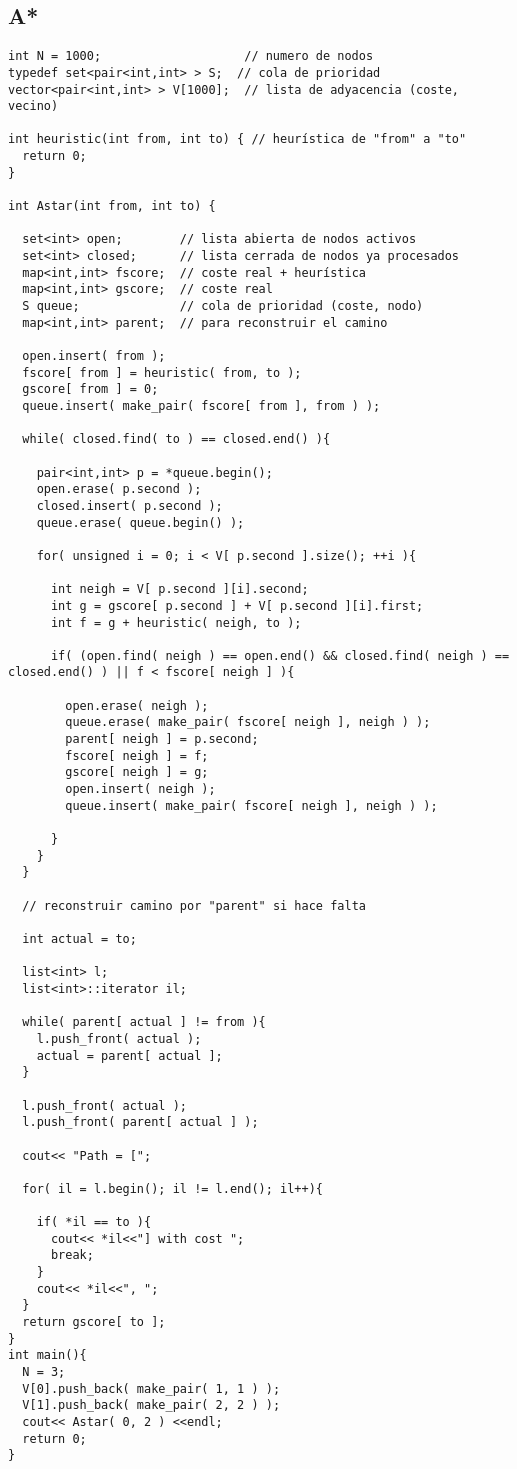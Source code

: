 \documentclass[10pt, a4, oneside]{article}
\begin{document}
\subsection{A*}
\begin{verbatim}
int N = 1000;                    // numero de nodos
typedef set<pair<int,int> > S;  // cola de prioridad
vector<pair<int,int> > V[1000];  // lista de adyacencia (coste, vecino)

int heuristic(int from, int to) { // heurística de "from" a "to"
  return 0;
}

int Astar(int from, int to) {

  set<int> open;        // lista abierta de nodos activos
  set<int> closed;      // lista cerrada de nodos ya procesados
  map<int,int> fscore;  // coste real + heurística
  map<int,int> gscore;  // coste real
  S queue;              // cola de prioridad (coste, nodo)
  map<int,int> parent;  // para reconstruir el camino
  
  open.insert( from );
  fscore[ from ] = heuristic( from, to );
  gscore[ from ] = 0;
  queue.insert( make_pair( fscore[ from ], from ) );
  
  while( closed.find( to ) == closed.end() ){
    
    pair<int,int> p = *queue.begin();
    open.erase( p.second );
    closed.insert( p.second );
    queue.erase( queue.begin() );
    
    for( unsigned i = 0; i < V[ p.second ].size(); ++i ){
      
      int neigh = V[ p.second ][i].second;
      int g = gscore[ p.second ] + V[ p.second ][i].first;
      int f = g + heuristic( neigh, to );
      
      if( (open.find( neigh ) == open.end() && closed.find( neigh ) == closed.end() ) || f < fscore[ neigh ] ){
        
        open.erase( neigh );
        queue.erase( make_pair( fscore[ neigh ], neigh ) );
        parent[ neigh ] = p.second;
        fscore[ neigh ] = f;
        gscore[ neigh ] = g;
        open.insert( neigh );
        queue.insert( make_pair( fscore[ neigh ], neigh ) );
        
      }
    }
  }
  
  // reconstruir camino por "parent" si hace falta
  
  int actual = to;
  
  list<int> l;
  list<int>::iterator il;
  
  while( parent[ actual ] != from ){
    l.push_front( actual );
    actual = parent[ actual ];
  }
  
  l.push_front( actual );
  l.push_front( parent[ actual ] );
  
  cout<< "Path = [";
  
  for( il = l.begin(); il != l.end(); il++){
    
    if( *il == to ){
      cout<< *il<<"] with cost ";
      break;
    }
    cout<< *il<<", ";
  }
  return gscore[ to ];
}
int main(){
  N = 3;
  V[0].push_back( make_pair( 1, 1 ) );
  V[1].push_back( make_pair( 2, 2 ) );
  cout<< Astar( 0, 2 ) <<endl;
  return 0;
}
\end{verbatim}
\end{document}
